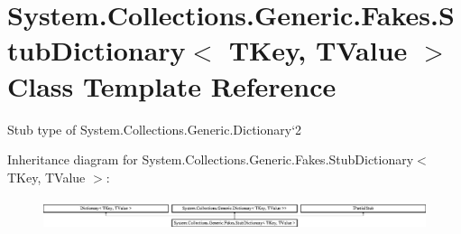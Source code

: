 \hypertarget{class_system_1_1_collections_1_1_generic_1_1_fakes_1_1_stub_dictionary_3_01_t_key_00_01_t_value_01_4}{\section{System.\-Collections.\-Generic.\-Fakes.\-Stub\-Dictionary$<$ T\-Key, T\-Value $>$ Class Template Reference}
\label{class_system_1_1_collections_1_1_generic_1_1_fakes_1_1_stub_dictionary_3_01_t_key_00_01_t_value_01_4}
}


Stub type of System.\-Collections.\-Generic.\-Dictionary`2 


Inheritance diagram for System.\-Collections.\-Generic.\-Fakes.\-Stub\-Dictionary$<$ T\-Key, T\-Value $>$\-:\begin{figure}[H]
\begin{center}
\leavevmode
\includegraphics[height=0.928690cm]{class_system_1_1_collections_1_1_generic_1_1_fakes_1_1_stub_dictionary_3_01_t_key_00_01_t_value_01_4}
\end{center}
\end{figure}
